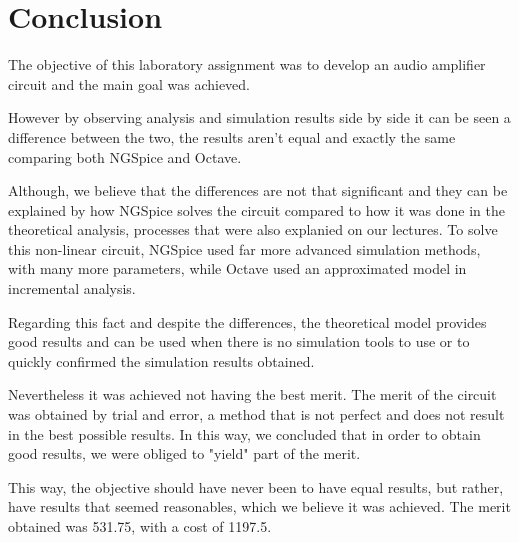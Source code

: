 \newpage
\section{Conclusion}
\label{sec:conclusion}

\hspace{0,5cm} The objective of this laboratory assignment was to develop an audio amplifier circuit and the main goal was achieved. 

\par However by observing analysis and simulation results side by side it can be seen a difference between the two, the results aren't equal and exactly the same comparing both NGSpice and Octave. 
\par Although, we believe that the differences are not that significant and they can be explained by how NGSpice solves the circuit compared to how it was done in the theoretical analysis, processes that were also explanied on our lectures. To solve this non-linear circuit, NGSpice used far more advanced simulation methods, with many more parameters, while Octave used an approximated model in incremental analysis. 
\par Regarding this fact and despite the differences, the theoretical model provides good results and can be used when there is no simulation tools to use or to quickly confirmed the simulation results obtained.

\par Nevertheless it was achieved not having the best merit. The merit of the circuit was obtained by trial and error, a method that is not perfect and does not result in the best possible results. In this way, we concluded that in order to obtain good results, we were obliged to "yield" part of the merit.

\par This way, the objective should have never been to have equal results, but rather, have results that seemed reasonables, which we believe it was achieved. The merit obtained was 531.75, with a cost of 1197.5.



